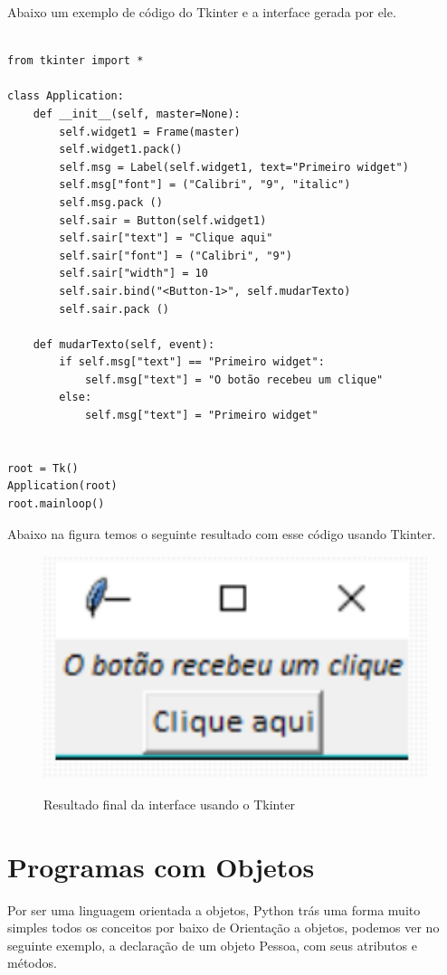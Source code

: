         Abaixo um exemplo de código do Tkinter e a interface gerada por ele.

\begin{lstlisting}

from tkinter import *

class Application:
    def __init__(self, master=None):
        self.widget1 = Frame(master)
        self.widget1.pack()
        self.msg = Label(self.widget1, text="Primeiro widget")
        self.msg["font"] = ("Calibri", "9", "italic")
        self.msg.pack ()
        self.sair = Button(self.widget1)
        self.sair["text"] = "Clique aqui"
        self.sair["font"] = ("Calibri", "9")
        self.sair["width"] = 10
        self.sair.bind("<Button-1>", self.mudarTexto)
        self.sair.pack ()

    def mudarTexto(self, event):
        if self.msg["text"] == "Primeiro widget":
            self.msg["text"] = "O botão recebeu um clique"
        else:
            self.msg["text"] = "Primeiro widget"


root = Tk()
Application(root)
root.mainloop()

\end{lstlisting}

Abaixo na figura temos o seguinte resultado com esse código usando Tkinter.

 \begin{figure}[H]
    \begin{center}
        \caption{Resultado final da interface usando o Tkinter} \label{ling1}
        \includegraphics[width=12cm]{Pictures/python-UI.png} \\
    \end{center}
   \end{figure}
    
    \section{Programas com Objetos}
    Por ser uma linguagem orientada a objetos, Python trás uma forma muito simples todos os conceitos por baixo de Orientação a objetos, podemos ver no seguinte exemplo, a declaração de um objeto Pessoa, com seus atributos e métodos.

